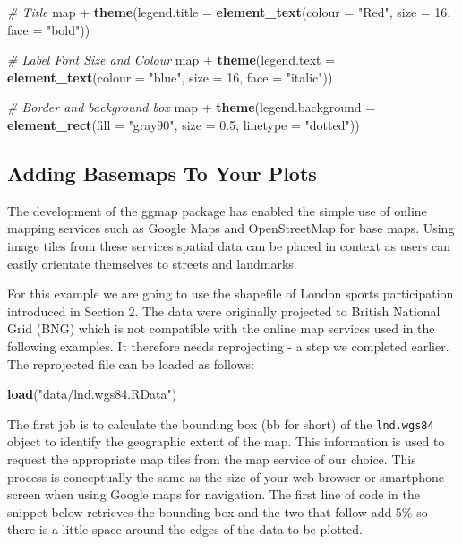 \documentclass[]{article}
\newenvironment{Shaded}{}{}
\newcommand{\KeywordTok}[1]{\textcolor[rgb]{0.00,0.44,0.13}{\textbf{{#1}}}}
\newcommand{\DataTypeTok}[1]{\textcolor[rgb]{0.56,0.13,0.00}{{#1}}}
\newcommand{\DecValTok}[1]{\textcolor[rgb]{0.25,0.63,0.44}{{#1}}}
\newcommand{\FloatTok}[1]{\textcolor[rgb]{0.25,0.63,0.44}{{#1}}}
\newcommand{\StringTok}[1]{\textcolor[rgb]{0.25,0.44,0.63}{{#1}}}
\newcommand{\CommentTok}[1]{\textcolor[rgb]{0.38,0.63,0.69}{\textit{{#1}}}}
\newcommand{\NormalTok}[1]{{#1}}
\begin{document}
\begin{Shaded}
\begin{Highlighting}[]
\CommentTok{# Title}
\NormalTok{map + }\KeywordTok{theme}\NormalTok{(}\DataTypeTok{legend.title =} \KeywordTok{element_text}\NormalTok{(}\DataTypeTok{colour =} \StringTok{"Red"}\NormalTok{, }\DataTypeTok{size =} \DecValTok{16}\NormalTok{, }\DataTypeTok{face =} \StringTok{"bold"}\NormalTok{))}

\CommentTok{# Label Font Size and Colour}
\NormalTok{map + }\KeywordTok{theme}\NormalTok{(}\DataTypeTok{legend.text =} \KeywordTok{element_text}\NormalTok{(}\DataTypeTok{colour =} \StringTok{"blue"}\NormalTok{, }\DataTypeTok{size =} \DecValTok{16}\NormalTok{, }\DataTypeTok{face =} \StringTok{"italic"}\NormalTok{))}

\CommentTok{# Border and background box}
\NormalTok{map + }\KeywordTok{theme}\NormalTok{(}\DataTypeTok{legend.background =} \KeywordTok{element_rect}\NormalTok{(}\DataTypeTok{fill =} \StringTok{"gray90"}\NormalTok{, }\DataTypeTok{size =} \FloatTok{0.5}\NormalTok{, }\DataTypeTok{linetype =} \StringTok{"dotted"}\NormalTok{))}
\end{Highlighting}
\end{Shaded}
\subsection{Adding Basemaps To Your Plots}

The development of the ggmap package has enabled the simple use of
online mapping services such as Google Maps and OpenStreetMap for base
maps. Using image tiles from these services spatial data can be placed
in context as users can easily orientate themselves to streets and
landmarks.

For this example we are going to use the shapefile of London sports
participation introduced in Section 2. The data were originally
projected to British National Grid (BNG) which is not compatible with
the online map services used in the following examples. It therefore
needs reprojecting - a step we completed earlier. The reprojected file
can be loaded as follows:

\begin{Shaded}
\begin{Highlighting}[]
\KeywordTok{load}\NormalTok{(}\StringTok{"data/lnd.wgs84.RData"}\NormalTok{)}
\end{Highlighting}
\end{Shaded}
The first job is to calculate the bounding box (bb for short) of the
\texttt{lnd.wgs84} object to identify the geographic extent of the map.
This information is used to request the appropriate map tiles from the
map service of our choice. This process is conceptually the same as the
size of your web browser or smartphone screen when using Google maps for
navigation. The first line of code in the snippet below retrieves the
bounding box and the two that follow add 5\% so there is a little space
around the edges of the data to be plotted.
\end{document}
